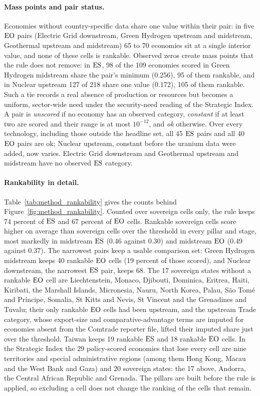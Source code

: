 

\paragraph{Mass points and pair status.} Economies without country-specific data share one value
within their pair: in five $\mathrm{EO}$ pairs (Electric Grid downstream, Green Hydrogen upstream and
midstream, Geothermal upstream and midstream) 65 to 70 economies sit at a single interior value,
and none of these cells is rankable. Observed zeros create mass points that the rule does not
remove: in $\mathrm{ES}$, 98 of the 109 economies scored in Green Hydrogen midstream share the pair's
minimum (0.256), 95 of them rankable, and in Nuclear upstream 127 of 218 share one value (0.172),
105 of them rankable. Such a tie records a real absence of production or resources but becomes a
uniform, sector-wide need under the security-need reading of the Strategic Index. A pair is
\emph{unscored} if no economy has an observed category, \emph{constant} if at least two are scored
and their range is at most $10^{-12}$, and \emph{ok} otherwise. Over every technology, including
those outside the headline set, all 45 $\mathrm{ES}$ pairs and all 40 $\mathrm{EO}$ pairs are ok; Nuclear upstream,
constant before the uranium data were added, now varies. Electric Grid downstream and Geothermal
upstream and midstream have no observed $\mathrm{ES}$ category.

\paragraph{Rankability in detail.} Table~\ref{tab:method_rankability} gives the counts behind
Figure~\ref{fig:method_rankability}. Counted over sovereign cells only, the rule keeps 74 percent of
$\mathrm{ES}$ and 67 percent of $\mathrm{EO}$ cells. Rankable sovereign cells score higher on average than sovereign
cells over the threshold in every pillar and stage, most markedly in midstream $\mathrm{ES}$ (0.46 against
0.30) and midstream $\mathrm{EO}$ (0.49 against 0.37). The narrowest pairs keep a usable comparison set:
Green Hydrogen midstream keeps 40 rankable $\mathrm{EO}$ cells (19 percent of those scored), and Nuclear
downstream, the narrowest $\mathrm{ES}$ pair, keeps 68. The 17 sovereign states without a rankable $\mathrm{EO}$
cell are Liechtenstein, Monaco, Djibouti, Dominica, Eritrea, Haiti, Kiribati, the Marshall Islands,
Micronesia, Nauru, North Korea, Palau, S\~ao Tom\'e and Pr\'incipe, Somalia, St Kitts and Nevis,
St Vincent and the Grenadines and Tuvalu; their only rankable $\mathrm{EO}$ cells had been upstream, and the
upstream Trade category, whose export-size and comparative-advantage terms are imputed for
economies absent from the Comtrade reporter file, lifted their imputed share just over the
threshold. Taiwan keeps 19 rankable $\mathrm{ES}$ and 18 rankable $\mathrm{EO}$ cells. In the Strategic Index the 29
policy-scored economies that lose every cell are nine territories and special administrative
regions (among them Hong Kong, Macau and the West Bank and Gaza) and 20 sovereign states: the 17
above, Andorra, the Central African Republic and Grenada. The pillars are built before the rule is
applied, so excluding a cell does not change the ranking of the cells that remain.



